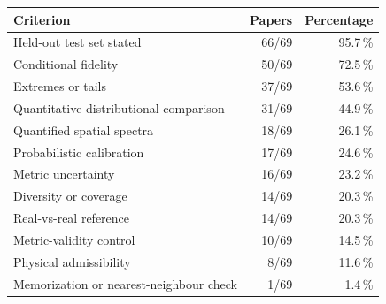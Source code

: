 \begin{tabular}{lrr}
\hline
Criterion & Papers & Percentage \\
\hline
Held-out test set stated & 66/69 & 95.7\,\% \\
Conditional fidelity & 50/69 & 72.5\,\% \\
Extremes or tails & 37/69 & 53.6\,\% \\
Quantitative distributional comparison & 31/69 & 44.9\,\% \\
Quantified spatial spectra & 18/69 & 26.1\,\% \\
Probabilistic calibration & 17/69 & 24.6\,\% \\
Metric uncertainty & 16/69 & 23.2\,\% \\
Diversity or coverage & 14/69 & 20.3\,\% \\
Real-vs-real reference & 14/69 & 20.3\,\% \\
Metric-validity control & 10/69 & 14.5\,\% \\
Physical admissibility & 8/69 & 11.6\,\% \\
Memorization or nearest-neighbour check & 1/69 & 1.4\,\% \\
\hline
\end{tabular}
